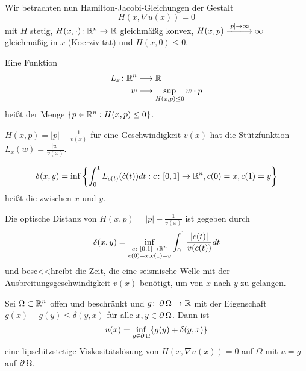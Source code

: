 	\mbox{} \\
	Wir betrachten nun Hamilton-Jacobi-Gleichungen der Gestalt
	\begin{equation}
		H(x,\nabla u(x)) = 0 \label{eq_0605_18} 
	\end{equation}
	mit $H$ stetig, $H(x,\cdot)\colon \mathbb{R}^n \rightarrow \mathbb{R}$ gleichmäßig konvex, $H(x,p) \xlongrightarrow{|p| \rightarrow \infty} \infty$ gleichmäßig in $x$ (Koerzivität) und $H(x,0) \leq 0$.
	
\begin{defn}[Stützfunktion]
	Eine Funktion \marginnote{[25]}
	\begin{equation}
	\begin{aligned}
		L_x\colon \mathbb{R}^n &\longrightarrow \mathbb{R} \\ \notag
		w &\longmapsto \sup_{H(x,p) \leq 0} w \cdot p
	\end{aligned}
	\end{equation}
	heißt  der Menge $\{p \in \mathbb{R}^n : H(x,p) \leq 0\}$.
\end{defn}
	
\begin{bsp} \label{bsp_26}
	$H(x,p) = |p| - \frac{1}{v(x)}$ für eine Geschwindigkeit $v(x)$ hat die Stützfunktion $L_x(w) = \frac{|w|}{v(x)}$. \marginnote{[26]}
\end{bsp}
	
\begin{defn} \label{def_27}
	\[ \delta(x,y) = \inf \left\{ \int_{0}^{1} L_{c(t)}(\dot{c}(t)) dt : c\colon [0,1] \rightarrow \mathbb{R}^n, c(0) = x, c(1) = y\right\} \]
	heißt die  zwischen $x$ und $y$. \marginnote{[27]}
\end{defn}
	
\begin{bsp} \label{bsp_28}
	Die optische Distanz von $H(x,p) = |p| - \frac{1}{v(x)}$ ist gegeben durch
	\[ \delta(x,y) = \inf_{\substack{c\colon[0,1] \rightarrow \mathbb{R}^n \\ c(0) = x, c(1) = y}} \int_{0}^{1} \frac{|\dot{c}(t)|}{v(c(t))} dt \]
	und besc<<hreibt die Zeit, die eine seismische Welle mit der Ausbreitungsgeschwindigkeit $v(x)$ benötigt, um von $x$ nach $y$ zu gelangen. \marginnote{[28]}
\end{bsp}

\begin{thm} \label{thm_29}
	Sei $\Omega \subset \mathbb{R}^n$ offen und beschränkt  und $g\colon \operatorname{\partial} \Omega \rightarrow \mathbb{R}$ mit der Eigenschaft $g(x)-g(y) \leq \delta(y,x)$ für alle $x,y \in \operatorname{\partial} \Omega$. Dann ist
	\[ u(x) = \inf_{y \in \operatorname{\partial} \Omega} \{g(y) + \delta(y,x) \} \]
	eine lipschitzstetige Viskositätslösung von $H(x,\nabla u(x)) = 0$ auf $\Omega$ mit $u = g$ auf $\operatorname{\partial} \Omega$.
\end{thm}
	
